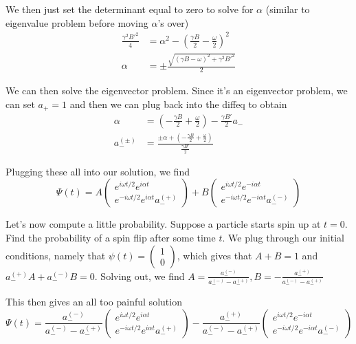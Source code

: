 \documentclass[10pt]{report}
\begin{document}
We then just set the determinant equal to zero to solve for $\alpha$ (similar to eigenvalue problem before moving $\alpha$'s over)
\begin{align*}
    \frac{\gamma^2 B'^2}{4} &= \alpha^2 - \left( \frac{\gamma B}{2} - \frac{\omega}{2} \right)^2\\
    \alpha &= \pm \frac{\sqrt{(\gamma B - \omega)^2 + \gamma^2 B'^2}}{2}
\end{align*}

We can then solve the eigenvector problem. Since it's an eigenvector problem, we can set $a_+ = 1$ and then we can plug back into the diffeq to obtain
\begin{align*}
    \alpha   &= \left(-\frac{\gamma B}{2}+ \frac{\omega}{2}\right) - \frac{\gamma B'}{2}a_-\\
    a^{(\pm)}_{-} &= \frac{\pm \alpha + \left( -\frac{\gamma B}{2} + \frac{\omega}{2} \right)}{\frac{\gamma B'}{2}}
\end{align*}

Plugging these all into our solution, we find
$$\Psi(t) = A\begin{pmatrix}e^{i\omega t/2}e^{i\alpha t}\\e^{-i\omega t/2}e^{i\alpha t}a^{(+)}_{-}\end{pmatrix} + B\begin{pmatrix}e^{i\omega t/2}e^{-i\alpha t}\\e^{-i\omega t/2}e^{-i\alpha t}a^{(-)}_{-}\end{pmatrix}$$

Let's now compute a little probability. Suppose a particle starts spin up at $t=0$. Find the probability of a spin flip after some time $t$. We plug through our initial conditions, namely that $\psi(t) = \begin{pmatrix}1\\0\end{pmatrix}$, which gives that $A+B=1$ and $a^{(+)}_- A + a^{(-)}_-B = 0$. Solving out, we find $A = \frac{a^{(-)}_-}{a^{(-)}_- - a^{(+)}_-}, B = -\frac{a^{(+)}_-}{a^{(-)}_- - a^{(+)}_-}$

This then gives an all too painful solution
$$\Psi(t) = \frac{a^{(-)}_-}{a^{(-)}_- - a^{(+)}_-}\begin{pmatrix}e^{i\omega t/2}e^{i\alpha t}\\e^{-i\omega t/2}e^{i\alpha t}a^{(+)}_{-}\end{pmatrix} -\frac{a^{(+)}_-}{a^{(-)}_- - a^{(+)}_-}\begin{pmatrix}e^{i\omega t/2}e^{-i\alpha t}\\e^{-i\omega t/2}e^{-i\alpha t}a^{(-)}_{-}\end{pmatrix}$$
\end{document}
